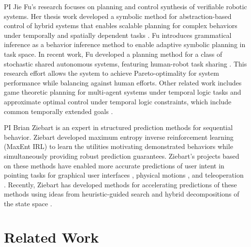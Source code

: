 \documentclass[letterpaper, 11 pt, onecolumn]{article}
\begin{document}
PI Jie Fu's research focuses on planning and control synthesis of verifiable robotic systems. Her thesis work developed a symbolic method for abstraction-based control of hybrid systems that enables scalable planning for complex behaviors under temporally and spatially dependent tasks \cite{fu2013bottom}. Fu introduces grammatical inference \cite{fu2014adaptive} as a behavior inference method to enable adaptive symbolic planning in task space. In recent work, Fu developed a  planning method for a class of stochastic shared autonomous systems, featuring  human-robot task sharing \cite{fu2016synthesis}. This research effort allows the system to achieve Pareto-optimality for system  performance while balancing against human efforts. Other related  work  includes game theoretic planning for multi-agent systems under  temporal logic tasks \cite{fu2015concurrent} and approximate optimal control under temporal logic constraints, which include common temporally extended goals \cite{fu2017sampling}.

PI Brian Ziebart is an expert in structured prediction methods for sequential behavior.  Ziebart developed maximum entropy inverse reinforcement learning (MaxEnt IRL) \cite{ziebart2008maximum,ziebart2010modeling} to learn the utilities motivating demonstrated behaviors while simultaneously providing robust prediction guarantees. 
Ziebart's projects based on these methods have enabled more accurate predictions of user intent in pointing tasks for graphical user interfaces \cite{ziebart2012probabilistic}, physical motions \cite{monfort2015intent}, and teleoperation \cite{schultz2017goal}.
Recently, Ziebart has developed methods for accelerating predictions of these methods using ideas from heuristic-guided search \cite{monfort2015softstar} and hybrid decompositions of the state space \cite{byravan2015graph}.


\section{Related Work}\label{sec:related}

\end{document}
